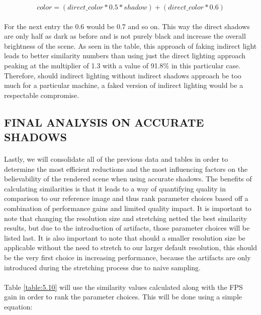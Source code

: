 \begin{equation}
color = (direct\_color*0.5*shadow)+(direct\_color*0.6)
\end{equation}

\paragraph{}
For the next entry the 0.6 would be 0.7 and so on.  This way the direct shadows are only half as dark as before and is not purely black and increase the overall brightness of the scene.  As seen in the table, this approach of faking indirect light leads to better similarity numbers than using just the direct lighting approach peaking at the multiplier of 1.3 with a value of 91.8\% in this particular case.  Therefore, should indirect lighting without indirect shadows approach be too much for a particular machine, a faked version of indirect lighting would be a respectable compromise.

\subsection{FINAL ANALYSIS ON ACCURATE SHADOWS} \label{sec:finalAnalysis}
\paragraph{}
Lastly, we will consolidate all of the previous data and tables in order to determine the most efficient reductions and the most influencing factors on the believability of the rendered scene when using accurate shadows.  The benefits of calculating similarities is that it leads to a way of quantifying quality in comparison to our reference image and thus rank parameter choices based off a combination of performance gains and limited quality impact.  It is important to note that changing the resolution size and stretching netted the best similarity results, but due to the introduction of artifacts, those parameter choices will be listed last.  It is also important to note that should a smaller resolution size be applicable without the need to stretch to our larger default resolution, this should be the very first choice in increasing performance, because the artifacts are only introduced during the stretching process due to naive sampling.

\paragraph{}
Table \ref{table:5.10} will use the similarity values calculated along with the FPS gain in order to rank the parameter choices.  This will be done using a simple equation:

